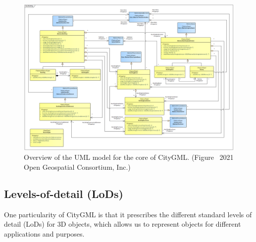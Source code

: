 \begin{figure}
  \centering
  \includegraphics[width=0.95\linewidth]{figs/citygml_uml_building}
  \caption[Overview of the UML model for the core of CityGML]{Overview of the UML model for the core of CityGML\@. (Figure \textcopyright\ 2021 Open Geospatial Consortium, Inc.)}%
\label{fig:citygml_uml_building}
\end{figure}



%

\subsection{Levels-of-detail (LoDs)}%
\label{sec:lods}

One particularity of CityGML is that it prescribes the different standard levels of detail (LoDs) for 3D objects, which allows us to represent objects for different applications and purposes.

